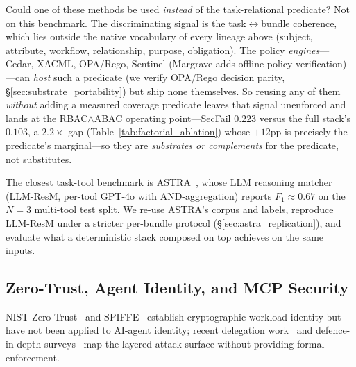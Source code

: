 \documentclass[sigconf,review,anonymous]{acmart}
\begin{document}
Could one of these methods be used \emph{instead} of the task-relational predicate? Not on this benchmark. The discriminating signal is the task$\leftrightarrow$bundle coherence, which lies outside the native vocabulary of every lineage above (subject, attribute, workflow, relationship, purpose, obligation). The policy \emph{engines}---Cedar, XACML, OPA/Rego, Sentinel (Margrave adds offline policy verification)---can \emph{host} such a predicate (we verify OPA/Rego decision parity, \S\ref{sec:substrate_portability}) but ship none themselves. So reusing any of them \emph{without} adding a measured coverage predicate leaves that signal unenforced and lands at the RBAC$\wedge$ABAC operating point---SecFail $0.223$ versus the full stack's $0.103$, a $2.2\times$ gap (Table~\ref{tab:factorial_ablation}) whose $+12$pp is precisely the predicate's marginal---so they are \emph{substrates or complements} for the predicate, not substitutes.

The closest task-tool benchmark is ASTRA~\cite{elhelou2025astra}, whose LLM reasoning matcher (LLM-ResM, per-tool GPT-4o with AND-aggregation) reports $F_1\!\approx\!0.67$ on the $N\!=\!3$ multi-tool test split. We re-use ASTRA's corpus and labels, reproduce LLM-ResM under a stricter per-bundle protocol (\S\ref{sec:astra_replication}), and evaluate what a deterministic stack composed on top achieves on the same inputs.

\subsection{Zero-Trust, Agent Identity, and MCP Security}
\label{sec:zero_trust}
\label{sec:agent_safety}

NIST Zero Trust~\cite{rose2020zero} and SPIFFE~\cite{spiffe2022} establish cryptographic workload identity but have not been applied to AI-agent identity; recent delegation work~\cite{south2025authenticated,rampalli2026pedigree} and defence-in-depth surveys~\cite{chu2026stateless,jangam2024comprehensive,muhammad2024integrative} map the layered attack surface without providing formal enforcement.
\end{document}
